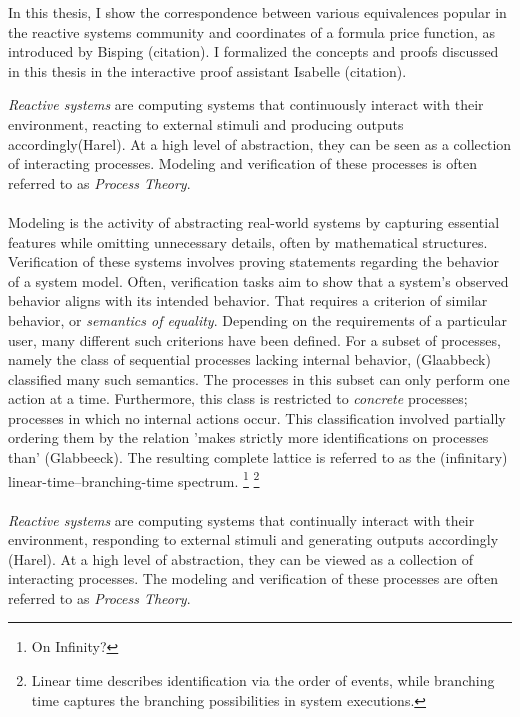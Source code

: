 %
\begin{isabellebody}%
%
%
\isadelimtheory
%
\endisadelimtheory
%
\isatagtheory
%
\endisatagtheory
{\isafoldtheory}%
%
\isadelimtheory
%
\endisadelimtheory
%
\isadelimdocument
%
\endisadelimdocument
%
\isatagdocument
%
\isamarkuptrue%
%
\endisatagdocument
{\isafolddocument}%
%
\isadelimdocument
%
\endisadelimdocument
%
\begin{isamarkuptext}%
In this thesis, I show the correspondence between various equivalences popular in the reactive
systems community and coordinates of a formula price function, as introduced by Bisping (citation).
I formalized the concepts and proofs discussed in this thesis in the interactive proof assistant Isabelle (citation).

\textit{Reactive systems} are computing systems that continuously interact with their environment, reacting to external stimuli and producing outputs accordingly(Harel).
At a high level of abstraction, they can be seen as a collection of interacting processes. Modeling and verification of these processes is often referred to as \textit{Process Theory}. \\\\

Modeling is the activity of abstracting real-world systems by capturing essential features while omitting unnecessary details, often by mathematical structures.
Verification of these systems involves proving statements regarding the behavior of a system model. Often, verification tasks aim to show that a system's observed behavior aligns with its intended behavior.
That requires a criterion of similar behavior, or \textit{semantics of equality}. Depending on the requirements of a particular user, many different such criterions have been defined.
For a subset of processes, namely the class of sequential processes lacking internal behavior, (Glaabbeck) classified many such semantics. 
The processes in this subset can only perform one action at a time. Furthermore, this class is restricted to \textit{concrete} processes; processes in which no internal actions occur.
This classification involved partially ordering them by the relation 'makes strictly more identifications on processes than' (Glabbeeck). The resulting complete lattice is
referred to as the (infinitary) linear-time--branching-time spectrum. \footnote{On Infinity?} 
\footnote{Linear time describes identification via the order of events, while branching time captures the branching possibilities in system executions.}
\\\\
\textit{Reactive systems} are computing systems that continually interact with their environment, responding to external stimuli and generating outputs accordingly (Harel). 
At a high level of abstraction, they can be viewed as a collection of interacting processes. The modeling and verification of these processes are often referred to as \textit{Process Theory}.


\end{isamarkuptext}
\end{isabellebody}
